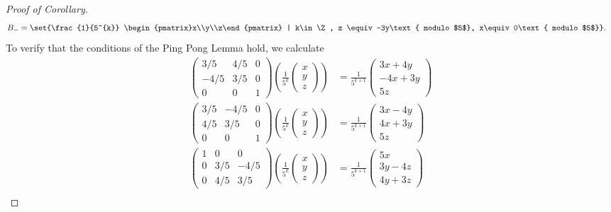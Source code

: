 \documentclass[10pt]{mypackage}
\begin{document}
\begin{proof}[Proof of Corollary]
\begin{align*}
    B_{-} &= \set{\frac{1}{5^{k}} \begin{pmatrix}x\\y\\z\end{pmatrix} | k\in \Z, z \equiv -3y\text{ modulo $5$}, x\equiv 0\text{ modulo $5$}}.
  \end{align*}
  To verify that the conditions of the Ping Pong Lemma hold, we calculate
  \begin{align*}
    \begin{pmatrix}3/5 & 4/5 & 0 \\ -4/5 & 3/5 & 0 \\ 0 & 0 & 1\end{pmatrix}\left(\frac{1}{5^k} \begin{pmatrix}x\\y\\z\end{pmatrix}\right) &= \frac{1}{5^{k+1}} \begin{pmatrix}3x + 4y \\ -4x + 3y \\ 5z\end{pmatrix}\tag*{(1)}\\
    \begin{pmatrix}3/5 & -4/5 & 0 \\ 4/5 & 3/5 & 0 \\ 0 & 0 & 1\end{pmatrix} \left(\frac{1}{5^k} \begin{pmatrix}x\\y\\z\end{pmatrix}\right) &= \frac{1}{5^{k+1}} \begin{pmatrix}3x - 4y \\ 4x + 3y \\ 5z\end{pmatrix}\tag*{(2)}\\
    \begin{pmatrix}1 & 0 & 0 \\ 0 & 3/5 & -4/5 \\ 0 & 4/5 & 3/5\end{pmatrix}\left(\frac{1}{5^{k}} \begin{pmatrix}x\\y\\z\end{pmatrix}\right) &= \frac{1}{5^{k+1}} \begin{pmatrix}5x \\ 3y- 4z \\ 4y + 3z\end{pmatrix}\tag*{(3)}\\

\end{align*}
\end{proof}
\end{document}
